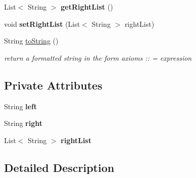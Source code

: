 \begin{DoxyCompactItemize}
\item 
\hypertarget{classcontext_free_1_1grammar_1_1_production_ae712218305325e3649fa26989db291de}{List$<$ String $>$ {\bfseries get\-Right\-List} ()}\label{classcontext_free_1_1grammar_1_1_production_ae712218305325e3649fa26989db291de}

\item 
\hypertarget{classcontext_free_1_1grammar_1_1_production_a84c7fa859310c752fa76fb1ecc3fedba}{void {\bfseries set\-Right\-List} (List$<$ String $>$ right\-List)}\label{classcontext_free_1_1grammar_1_1_production_a84c7fa859310c752fa76fb1ecc3fedba}

\item 
\hypertarget{classcontext_free_1_1grammar_1_1_production_a43d78cd85446efbbffe59a2278c410d1}{String \hyperlink{classcontext_free_1_1grammar_1_1_production_a43d78cd85446efbbffe59a2278c410d1}{to\-String} ()}\label{classcontext_free_1_1grammar_1_1_production_a43d78cd85446efbbffe59a2278c410d1}

\begin{DoxyCompactList}\small\item\em return a formatted string in the form axioms \-:\-: = expression \end{DoxyCompactList}\end{DoxyCompactItemize}
\subsection*{Private Attributes}
\begin{DoxyCompactItemize}
\item 
\hypertarget{classcontext_free_1_1grammar_1_1_production_ad188a705cd57d55d32fd198e6af71f75}{String {\bfseries left}}\label{classcontext_free_1_1grammar_1_1_production_ad188a705cd57d55d32fd198e6af71f75}

\item 
\hypertarget{classcontext_free_1_1grammar_1_1_production_ab72c30da44fb1fbf41b9a70bf799ef58}{String {\bfseries right}}\label{classcontext_free_1_1grammar_1_1_production_ab72c30da44fb1fbf41b9a70bf799ef58}

\item 
\hypertarget{classcontext_free_1_1grammar_1_1_production_a51394e602f57b3e2f9b07d14fd01adb9}{List$<$ String $>$ {\bfseries right\-List}}\label{classcontext_free_1_1grammar_1_1_production_a51394e602f57b3e2f9b07d14fd01adb9}

\end{DoxyCompactItemize}


\subsection{Detailed Description}


